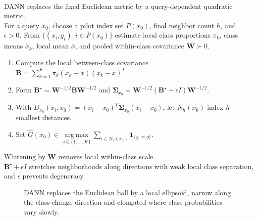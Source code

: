 \begin{method} \label{meth:sl-discriminant-adaptive-nearest-neighbor} \\
DANN replaces the fixed Euclidean metric by a query-dependent quadratic metric.\\
For a query $x_0$, choose a pilot index set $P(x_0)$, final neighbor count $h$, and $\epsilon>0$. From $\{(x_i,g_i):i\in P(x_0)\}$ estimate local class proportions $\pi_k$, class means $\bar{x}_k$, local mean $\bar{x}$, and pooled within-class covariance $\mathbf{W}\succ0$.
\begin{enumerate}[label=(\roman*)]
\setlength{\itemsep}{0pt}
\item Compute the local between-class covariance $\mathbf{B}=\sum\limits_{k=1}^K\pi_k(\bar{x}_k-\bar{x})(\bar{x}_k-\bar{x})^T$.
\item Form $\mathbf{B}^\star=\mathbf{W}^{-1/2}\mathbf{B}\mathbf{W}^{-1/2}$ and $\bm{\Sigma}_{x_0}=\mathbf{W}^{-1/2}(\mathbf{B}^\star+\epsilon I)\mathbf{W}^{-1/2}$.
\item With $D_{x_0}(x_i,x_0)=(x_i-x_0)^T\bm{\Sigma}_{x_0}(x_i-x_0)$, let $N_h(x_0)$ index $h$ smallest distances.\\
\item Set $\widehat{G}(x_0)\in\operatorname*{arg\,max}\limits_{g\in\{1,\ldots,K\}}\sum\limits_{i\in N_h(x_0)}\mathbf{1}_{\{g_i=g\}}$.
\end{enumerate}
Whitening by $\mathbf{W}$ removes local within-class scale.\\
$\mathbf{B}^\star+\epsilon I$ stretches neighborhoods along directions with weak local class separation, and $\epsilon$ prevents degeneracy.
\end{method}

\begin{figure}[H]
\centering

\caption{DANN replaces the \textcolor{gray!65!black}{Euclidean ball} by a \textcolor{green!55!black}{local ellipsoid}, narrow along the \textcolor{red!75!black}{class-change direction} and elongated where class probabilities vary slowly.}
\label{fig:sl-dann-adaptive-neighborhood}
\end{figure}


